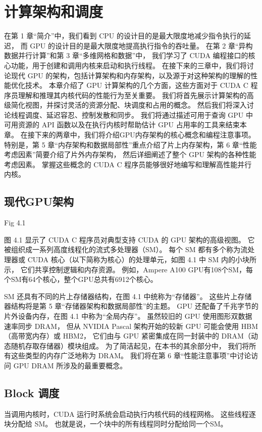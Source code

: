 \section{计算架构和调度}
在第 1 章“简介”中，我们看到 CPU 的设计目的是最大限度地减少指令执行的延迟，
而 GPU 的设计目的是最大限度地提高执行指令的吞吐量。 在第 2 章“异构数据并行计算”和第 3 章“多维网格和数据”中，
我们学习了 CUDA 编程接口的核心功能，用于创建和调用内核来启动和执行线程。 
在接下来的三章中，我们将讨论现代 GPU 的架构，包括计算架构和内存架构，以及源于对这种架构的理解的性能优化技术。 
本章介绍了 GPU 计算架构的几个方面，这些方面对于 CUDA C 程序员理解和推理其内核代码的性能行为至关重要。 
我们将首先展示计算架构的高级简化视图，并探讨灵活的资源分配、块调度和占用的概念。 
然后我们将深入讨论线程调度、延迟容忍、控制发散和同步。 
我们将通过描述可用于查询 GPU 中可用资源的 API 函数以及在执行内核时帮助估计 GPU 占用率的工具来结束本章。 
在接下来的两章中，我们将介绍GPU内存架构的核心概念和编程注意事项。 
特别是，第 5 章“内存架构和数据局部性”重点介绍了片上内存架构，第 6 章“性能考虑因素”简要介绍了片外内存架构，
然后详细阐述了整个 GPU 架构的各种性能考虑因素。 掌握这些概念的 CUDA C 程序员能够很好地编写和理解高性能并行内核。

\subsection{现代GPU架构}
{\color{red} Fig 4.1}

图 4.1 显示了 CUDA C 程序员对典型支持 CUDA 的 GPU 架构的高级视图。 它被组织成一系列高度线程化的流式多处理器（SM）。 
每个 SM 都有多个称为流处理器或 CUDA 核心（以下简称为核心）的处理单元，如图 4.1 中 SM 内的小块所示，
它们共享控制逻辑和内存资源。 例如，Ampere A100 GPU有108个SM，每个SM有64个核心，整个GPU总共有6912个核心。

SM 还具有不同的片上存储器结构，在图 4.1 中统称为“存储器”。 这些片上存储器结构将是第 5 章“存储器架构和数据局部性”的主题。 
GPU 还配备了千兆字节的片外设备内存，在图 4.1 中称为“全局内存”。 虽然较旧的 GPU 使用图形双数据速率同步 DRAM，
但从 NVIDIA Pascal 架构开始的较新 GPU 可能会使用 HBM（高带宽内存）或 HBM2，
它们由与 GPU 紧密集成在同一封装中的 DRAM（动态随机存取存储器）模块组成。 为了简洁起见，在本书的其余部分中，
我们将所有这些类型的内存广泛地称为 DRAM。 我们将在第 6 章“性能注意事项”中讨论访问 GPU DRAM 所涉及的最重要概念。

\subsection{Block 调度}
当调用内核时，CUDA 运行时系统会启动执行内核代码的线程网格。 这些线程逐块分配给 SM。 
也就是说，一个块中的所有线程同时分配给同一个SM。

